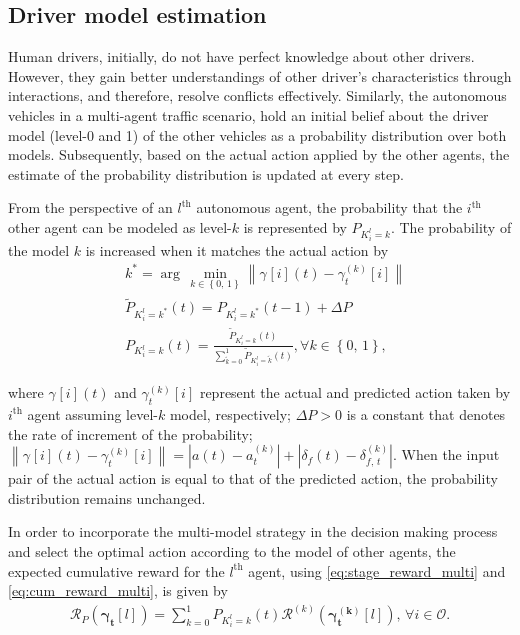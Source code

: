 \documentclass[10pt,journal]{IEEEtran}
\newcommand{\nth}[1]{$#1^{\textrm{th}}$}
\newcommand{\actk}[3]{\gamma^{\left(#2\right)}_{#3}[#1]}
\newcommand{\actt}[3]{\gamma^{}[#1](#3)}
\begin{document}
	\subsection{Driver model estimation}

	Human drivers, initially, do not have perfect knowledge about other drivers. However, they gain better understandings of other driver's characteristics through interactions, and therefore, resolve conflicts effectively. Similarly, the autonomous vehicles in a multi-agent traffic scenario, hold an initial belief about the driver model (level-0 and 1) of the other vehicles as a probability distribution over both models. Subsequently, based on the actual action applied by the other agents, the estimate of the probability distribution is updated at every step.
	
	From the perspective of an \nth{l} autonomous agent, the probability that the \nth{i} other agent can be modeled as level-$k$ is represented by $P_{K_{i}^l = k}$. The probability of the model $k$ is increased when it matches the actual action by 
	\begin{subequations}
		\begin{align}
			&k^* = \arg \, \underset{k \in \left\{0,\,1 \right\}} {\min} \left\| \actt{i}{k}{t} - \actk{i}{k}{t}  \right\|  \\ 
			& \tilde{P}_{K_{i}^l = k^*} \left(t\right) = {P}_{K_{i}^l = k^*} \left(t-1\right) + \Delta P  \\ 
			& {P}_{K_{i}^l = k}\left(t\right) = \frac{\tilde{P}_{K_{i}^l = k}\left(t\right) }{\sum_{\tilde{k} = 0}^{1} \tilde{P}_{K_{i}^l = \tilde{k}}\left(t\right) },  \forall k \in \left\{0,\,1 \right\},
		\end{align}
	\end{subequations}
	
	\noindent where $\actt{i}{k}{t}$ and $\actk{i}{k}{t}$ represent the actual and predicted action taken by \nth{i} agent assuming level-$k$ model, respectively; $\Delta P >0 $ is a constant that denotes the rate of increment of the probability;  $\left\|\actt{i}{k}{t} - \actk{i}{k}{t}\right\| = \left| a\left(t\right) - a_t^{(k)} \right| + \left|  \delta_f\left(t\right) - \delta_{f,\,t}^{(k)} \right|$. When the input pair of the actual action is equal to that of the predicted action, the probability distribution remains unchanged.

	In order to incorporate the multi-model strategy in the decision making process and select the optimal action according to the model of other agents, the expected cumulative reward for the \nth{l} agent, using \eqref{eq:stage_reward_multi} and \eqref{eq:cum_reward_multi}, is given by
	\begin{align}
		\mathcal{R}_P\left(\boldsymbol{\gamma_{t}}[l]\right)  = \sum_{k=0}^{1} {P}_{K_{i}^l = k}\left(t\right)  \mathcal{R}^{(k)}\left(\boldsymbol{\gamma_{t}^{(k)}}[l]\right),\, \forall i \in \mathcal{O}.
		\label{eq:cum_reward_prob}
	\end{align}
	 
\end{document}
